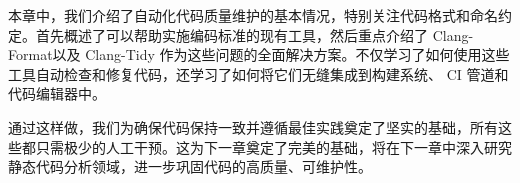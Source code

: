 
本章中，我们介绍了自动化代码质量维护的基本情况，特别关注代码格式和命名约定。首先概述了可以帮助实施编码标准的现有工具，然后重点介绍了 Clang-Format以及 Clang-Tidy 作为这些问题的全面解决方案。不仅学习了如何使用这些工具自动检查和修复代码，还学习了如何将它们无缝集成到构建系统、 CI 管道和代码编辑器中。

通过这样做，我们为确保代码保持一致并遵循最佳实践奠定了坚实的基础，所有这些都只需极少的人工干预。这为下一章奠定了完美的基础，将在下一章中深入研究静态代码分析领域，进一步巩固代码的高质量、可维护性。

